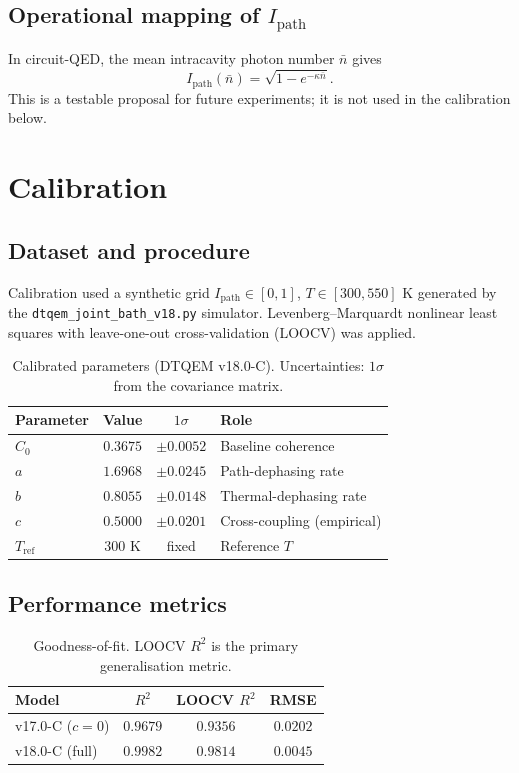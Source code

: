 \documentclass[aps,pra,reprint,amsmath,amssymb,superscriptaddress]{revtex4-2}
\begin{document}
\subsection{Operational mapping of $I_{\text{path}}$}
In circuit-QED, the mean intracavity photon number $\bar{n}$ gives \cite{Blais2021}
\begin{equation}
I_{\text{path}}(\bar{n}) = \sqrt{1 - e^{-\kappa \bar{n}}}.
\label{eq:ipath}
\end{equation}
This is a testable proposal for future experiments; it is not used in the calibration below.

\section{Calibration}
\subsection{Dataset and procedure}
Calibration used a synthetic grid $I_{\text{path}} \in [0, 1]$, $T \in [300, 550]$ K generated by the \texttt{dtqem\_joint\_bath\_v18.py} simulator. Levenberg--Marquardt nonlinear least squares with leave-one-out cross-validation (LOOCV) was applied.

\begin{table}[htbp]
\centering
\caption{Calibrated parameters (DTQEM v18.0-C). Uncertainties: $1\sigma$ from the covariance matrix.}
\label{tab:params}
\begin{tabular}{l c c l}
\toprule
Parameter & Value & $1\sigma$ & Role \\
\midrule
$C_0$ & $0.3675$ & $\pm 0.0052$ & Baseline coherence \\
$a$ & $1.6968$ & $\pm 0.0245$ & Path-dephasing rate \\
$b$ & $0.8055$ & $\pm 0.0148$ & Thermal-dephasing rate \\
$c$ & $0.5000$ & $\pm 0.0201$ & Cross-coupling (empirical) \\
$T_{\text{ref}}$ & $300$ K & fixed & Reference $T$ \\
\bottomrule
\end{tabular}
\end{table}

\subsection{Performance metrics}
\begin{table}[htbp]
\centering
\caption{Goodness-of-fit. LOOCV $R^2$ is the primary generalisation metric.}
\label{tab:metrics}
\begin{tabular}{l c c c}
\toprule
Model & $R^2$ & LOOCV $R^2$ & RMSE \\
\midrule
v17.0-C ($c=0$) & $0.9679$ & $0.9356$ & $0.0202$ \\
v18.0-C (full) & $0.9982$ & $0.9814$ & $0.0045$ \\
\bottomrule
\end{tabular}
\end{table}
\end{document}
